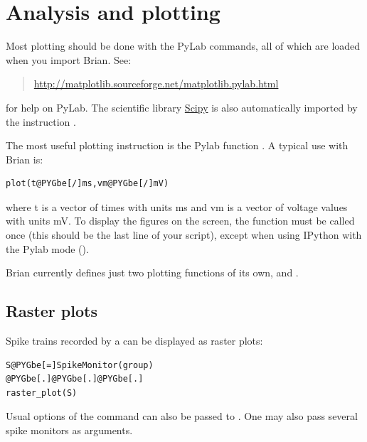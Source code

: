 \documentclass[letterpaper,10pt]{manual}
\begin{document}
\resetcurrentobjects
{}

\hypertarget{index-0}{}\section{Analysis and plotting}
Most plotting should be done with the PyLab commands, all of
which are loaded when you import Brian. See:
\begin{quote}

\href{http://matplotlib.sourceforge.net/matplotlib.pylab.html}{http://matplotlib.sourceforge.net/matplotlib.pylab.html}
\end{quote}

for help on PyLab. The scientific library \href{http://www.scipy.org}{Scipy} is also automatically
imported by the instruction .

The most useful plotting instruction is the Pylab function . A typical use with Brian is:

\begin{Verbatim}[commandchars=@\[\]]
plot(t@PYGbe[/]ms,vm@PYGbe[/]mV)
\end{Verbatim}

where t is a vector of times with units ms and vm is a vector of voltage values with units mV.
To display the figures on the screen, the function  must be called once (this should be the
last line of your script), except when using IPython with the Pylab mode ().

Brian currently defines just two plotting functions of its own,
\hyperlink{brian.raster_plot}{} and \hyperlink{brian.hist_plot}{}.


\subsection{Raster plots}

Spike trains recorded by a \hyperlink{brian.SpikeMonitor}{} can be displayed as raster plots:

\begin{Verbatim}[commandchars=@\[\]]
S@PYGbe[=]SpikeMonitor(group)
@PYGbe[.]@PYGbe[.]@PYGbe[.]
raster_plot(S)
\end{Verbatim}

Usual options of the  command can also be passed to \hyperlink{brian.raster_plot}{}. One may also pass
several spike monitors as arguments.
\end{document}

